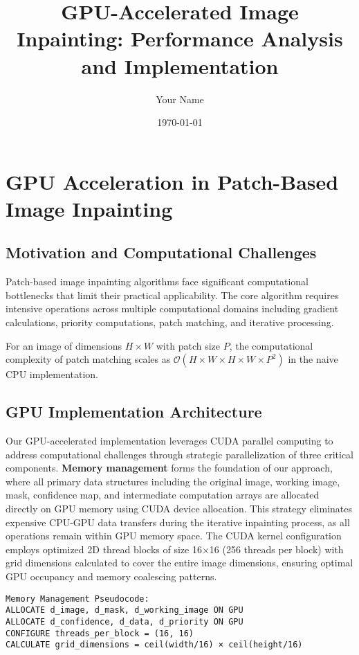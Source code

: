\documentclass[11pt]{article}
\title{GPU-Accelerated Image Inpainting: Performance Analysis and Implementation}
\author{Your Name}
\date{\today}
\begin{document}
\maketitle

\section{GPU Acceleration in Patch-Based Image Inpainting}

\subsection{Motivation and Computational Challenges}

Patch-based image inpainting algorithms face significant computational bottlenecks that limit their practical applicability. The core algorithm requires intensive operations across multiple computational domains including gradient calculations, priority computations, patch matching, and iterative processing.

For an image of dimensions $H \times W$ with patch size $P$, the computational complexity of patch matching scales as $\mathcal{O}(H \times W \times H \times W \times P^2)$ in the naive CPU implementation.

\subsection{GPU Implementation Architecture}

Our GPU-accelerated implementation leverages CUDA parallel computing to address computational challenges through strategic parallelization of three critical components. \textbf{Memory management} forms the foundation of our approach, where all primary data structures including the original image, working image, mask, confidence map, and intermediate computation arrays are allocated directly on GPU memory using CUDA device allocation. This strategy eliminates expensive CPU-GPU data transfers during the iterative inpainting process, as all operations remain within GPU memory space. The CUDA kernel configuration employs optimized 2D thread blocks of size 16×16 (256 threads per block) with grid dimensions calculated to cover the entire image dimensions, ensuring optimal GPU occupancy and memory coalescing patterns.

\begin{verbatim}
Memory Management Pseudocode:
ALLOCATE d_image, d_mask, d_working_image ON GPU
ALLOCATE d_confidence, d_data, d_priority ON GPU  
CONFIGURE threads_per_block = (16, 16)
CALCULATE grid_dimensions = ceil(width/16) × ceil(height/16)
\end{verbatim}
\end{document}
